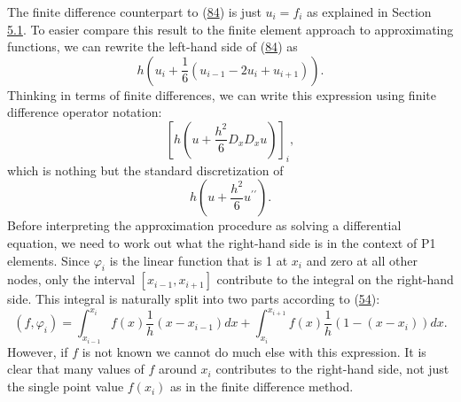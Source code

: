 \documentclass[../main.tex]{subfiles}
\begin{document}
The finite difference counterpart to (\hyperref[eqa84]{84}) is just $u_{i}=f_{i}$ as explained in Section \hyperref[sec:sec_5_1]{5.1}. To easier compare this result to the finite element approach to approximating functions, we can rewrite the left-hand side of (\hyperref[eqa84]{84}) as
\begin{equation}\label{eqa85}
	h\left(u_{i}+\frac{1}{6}\left(u_{i-1}-2 u_{i}+u_{i+1}\right)\right).
\end{equation}
Thinking in terms of finite differences, we can write this expression using finite difference operator notation:
$$
\left[h\left(u+\frac{h^{2}}{6} D_{x} D_{x} u\right)\right]_{i},
$$
which is nothing but the standard discretization of
$$
h\left(u+\frac{h^{2}}{6} u^{\prime \prime}\right) .
$$
Before interpreting the approximation procedure as solving a differential equation, we need to work out what the right-hand side is in the context of P1 elements. Since $\varphi_{i}$ is the linear function that is 1 at $x_{i}$ and zero at all other nodes, only the interval $\left[x_{i-1}, x_{i+1}\right]$ contribute to the integral on the right-hand side. This integral is naturally split into two parts according to (\hyperref[eqa54]{54}):
$$
\left(f, \varphi_{i}\right)=\int_{x_{i-1}}^{x_{i}} f(x) \frac{1}{h}\left(x-x_{i-1}\right) d x+\int_{x_{i}}^{x_{i+1}} f(x) \frac{1}{h}\left(1-\left(x-x_{i}\right)\right) d x.
$$
However, if $f$ is not known we cannot do much else with this expression. It is clear that many values of $f$ around $x_{i}$ contributes to the right-hand side, not just the single point value $f\left(x_{i}\right)$ as in the finite difference method.
\end{document}
